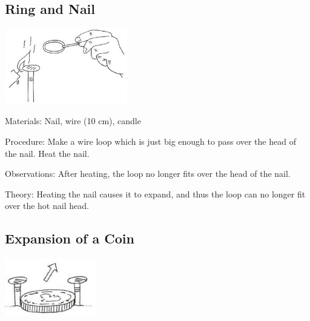 \begin{multicols}{2}
\subsection{Ring and Nail}

\begin{center}
\includegraphics[width=0.4\textwidth]{./img/vso/ring-nail.jpg}
\end{center}

\begin{description*}
\item[Materials:]{Nail, wire (10 cm), candle}
\item[Procedure:]{Make a wire loop which is just big enough to pass over the head of the nail. Heat the nail.}
\item[Observations:]{After heating, the loop no longer fits over the head of the nail.}
\item[Theory:]{Heating the nail causes it to expand, and thus the loop can no longer fit over the hot nail head.}
\end{description*}

\subsection{Expansion of a Coin}

\begin{center}
\includegraphics[width=0.3\textwidth]{./img/vso/expansion-coin.jpg}
\end{center}


\end{multicols}
